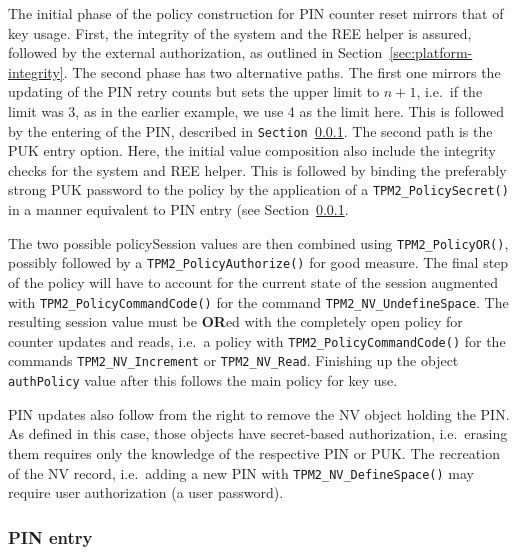\documentclass{sig-alternate-2013}
\begin{document}
The initial phase of the policy construction for PIN counter reset mirrors that
of key usage. First, the integrity of the system and the REE helper is assured,
followed by the external authorization, as outlined in
Section~\ref{sec:platform-integrity}. The second phase has two alternative
paths. The first one mirrors the updating of the PIN retry counts but sets the
upper limit to $n+1$, i.e.\ if the limit was 3, as in the earlier example, we
use 4 as the limit here. This is followed by the entering of the PIN, described
in \texttt{Section~\ref{sec:pin-entry}}. The second path is the PUK entry
option. Here, the initial value composition also include the integrity checks
for the system and REE helper. This is followed by binding the preferably
strong PUK password to the policy by the application of a
\texttt{TPM2\_PolicySecret()} in a manner equivalent to PIN entry (see
Section~\ref{sec:pin-entry}.

The two possible policySession values are then combined using
\texttt{TPM2\_PolicyOR()}, possibly followed by a
\texttt{TPM2\_PolicyAuthorize()} for good measure. The final step of the policy
will have to account for the current state of the session augmented with
\texttt{TPM2\_PolicyCommandCode()} for the command
\texttt{TPM2\_NV\_UndefineSpace}. The resulting session value must be \textbf{OR}ed with
the completely open policy for counter updates and reads, i.e.\ a policy with
\texttt{TPM2\_PolicyCommandCode()} for the commands \texttt{TPM2\_NV\_Increment}
or \texttt{TPM2\_NV\_Read}. Finishing up the object \texttt{authPolicy} value
after this follows the main policy for key use.

PIN updates also follow from the right to remove the NV object holding the
PIN\@. As defined in this case, those objects have secret-based authorization,
i.e.\ erasing them requires only the knowledge of the respective PIN or PUK\@.
The recreation of the NV record, i.e.\ adding a new PIN with
\texttt{TPM2\_NV\_DefineSpace()} may require user authorization (a user
password).

\subsubsection{PIN entry}
\label{sec:pin-entry}
\end{document}
